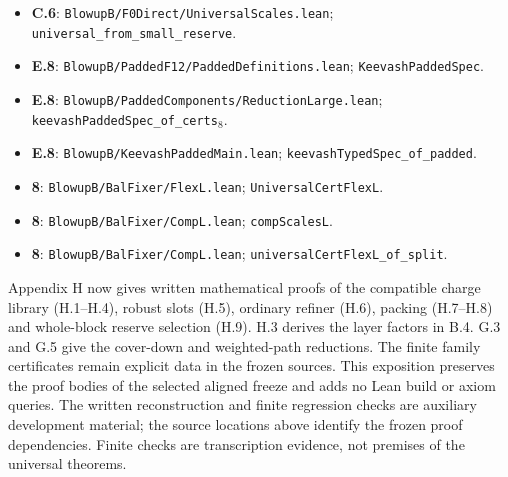 \documentclass[english,11pt,a4paper]{article}
\begin{document}
\begin{itemize}
\item
  \textbf{C.6}: \texttt{Blowup\allowbreak{}B/\allowbreak{}F0Di\allowbreak{}rect/\allowbreak{}Univers\allowbreak{}al\allowbreak{}Scales.\allowbreak{}lea\allowbreak{}n}; \texttt{universal\_\allowbreak{}fr\allowbreak{}om\_\allowbreak{}small\_\allowbreak{}res\allowbreak{}erve}.
\item
  \textbf{E.8}: \texttt{Blowup\allowbreak{}B/\allowbreak{}Padd\allowbreak{}ed\allowbreak{}F12/\allowbreak{}Padded\allowbreak{}\allowbreak{}Definitions.\allowbreak{}\allowbreak{}lean}; \texttt{Keevash\allowbreak{}Padde\allowbreak{}d\allowbreak{}Spec}.
\item
  \textbf{E.8}: \texttt{Blowup\allowbreak{}B/\allowbreak{}Padd\allowbreak{}ed\allowbreak{}Components\allowbreak{}/\allowbreak{}Reduction\allowbreak{}La\allowbreak{}rge.\allowbreak{}lean}; \texttt{keevash\allowbreak{}Padde\allowbreak{}d\allowbreak{}Spec\_\allowbreak{}of\_\allowbreak{}cer\allowbreak{}ts\ensuremath{{}_{8}}}.
\item
  \textbf{E.8}: \texttt{Blowup\allowbreak{}B/\allowbreak{}Keev\allowbreak{}ash\allowbreak{}Padded\allowbreak{}Mai\allowbreak{}n.\allowbreak{}lean}; \texttt{keevash\allowbreak{}Typed\allowbreak{}\allowbreak{}Spec\_\allowbreak{}of\_\allowbreak{}padd\allowbreak{}ed}.
\item
  \textbf{8}: \texttt{Blowup\allowbreak{}B/\allowbreak{}Bal\allowbreak{}F\allowbreak{}ixer/\allowbreak{}Flex\allowbreak{}L.\allowbreak{}l\allowbreak{}ean}; \texttt{Universal\allowbreak{}Cer\allowbreak{}t\allowbreak{}Flex\allowbreak{}L}.
\item
  \textbf{8}: \texttt{Blowup\allowbreak{}B/\allowbreak{}Bal\allowbreak{}F\allowbreak{}ixer/\allowbreak{}Comp\allowbreak{}L.\allowbreak{}l\allowbreak{}ean}; \texttt{comp\allowbreak{}Scales\allowbreak{}L}.
\item
  \textbf{8}: \texttt{Blowup\allowbreak{}B/\allowbreak{}Bal\allowbreak{}F\allowbreak{}ixer/\allowbreak{}Comp\allowbreak{}L.\allowbreak{}l\allowbreak{}ean}; \texttt{universal\allowbreak{}Cer\allowbreak{}t\allowbreak{}Flex\allowbreak{}L\_\allowbreak{}of\_\allowbreak{}sp\allowbreak{}lit}.
\end{itemize}

Appendix H now gives written mathematical proofs of the compatible charge library (H.1--H.4), robust slots (H.5), ordinary refiner (H.6), packing (H.7--H.8) and whole-block reserve selection (H.9). H.3 derives the layer factors in B.4. G.3 and G.5 give the cover-down and weighted-path reductions. The finite family certificates remain explicit data in the frozen sources. This exposition preserves the proof bodies of the selected aligned freeze and adds no Lean build or axiom queries. The written reconstruction and finite regression checks are auxiliary development material; the source locations above identify the frozen proof dependencies. Finite checks are transcription evidence, not premises of the universal theorems.
\end{document}
